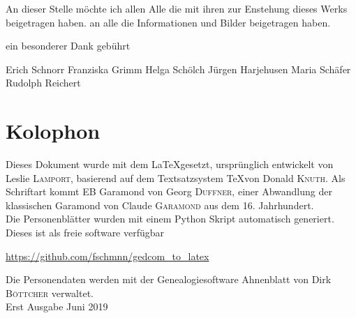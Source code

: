\documentclass[
    paper    = a4,
    fontsize = 12pt,
    BCOR     = 5mm,
    twoside  = true,
    DIV      = 12,
    open     = right,
    ]{scrreprt}
\begin{document}
An dieser Stelle möchte ich allen 
Alle die mit ihren zur Enstehung dieses Werks beigetragen haben. 
an alle die Informationen und Bilder beigetragen haben. 

ein besonderer Dank gebührt 

Erich Schnorr
Franziska Grimm
Helga Schölch
Jürgen Harjehusen
Maria Schäfer
Rudolph Reichert

\tableofcontents
{}


 

 
 






\printindex
{}


\listoffigures
{}

\cleardoublepage
\thispagestyle{empty}
\hfill
\vfill


\section*{Kolophon}
Dieses Dokument wurde mit dem  \LaTeX gesetzt, ursprünglich entwickelt von Leslie \textsc{Lamport}, basierend auf dem Textsatzsystem \TeX von Donald \textsc{Knuth}. Als Schriftart kommt EB Garamond von Georg \textsc{Duffner}, einer Abwandlung der klassischen Garamond von Claude \textsc{Garamond} aus dem 16. Jahrhundert.\\
Die Personenblätter wurden mit einem Python Skript automatisch generiert. Dieses ist als freie software verfügbar
\begin{center}
\url{https://github.com/fschmnn/gedcom_to_latex}
\end{center}
Die Personendaten werden mit der Genealogiesoftware Ahnenblatt von Dirk \textsc{Böttcher} verwaltet.\\

Erst Ausgabe Juni 2019
\end{document}
